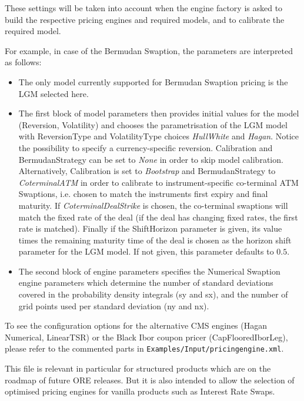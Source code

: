 These settings will be taken into account when the engine factory is asked to build the respective pricing engines and required models, and to calibrate the required model.

\medskip
For example, in case of the Bermudan Swaption, the parameters are interpreted as follows:

\begin{itemize}
\item The only model currently supported for Bermudan Swaption pricing is the LGM selected here. 

\item The first block of model parameters then provides initial values for the model (Reversion, Volatility) and chooses
  the parametrisation of the LGM model with ReversionType and VolatilityType choices {\em HullWhite} and {\em
    Hagan}. Notice the possibility to specify a currency-specific reversion. Calibration and BermudanStrategy can be set
  to {\em None} in order to skip model calibration. Alternatively, Calibration is set to {\em Bootstrap} and
  BermudanStrategy to {\em CoterminalATM} in order to calibrate to instrument-specific co-terminal ATM Swaptions,
  i.e. chosen to match the instruments first expiry and final maturity.  If {\em CoterminalDealStrike} is chosen, the
  co-terminal swaptions will match the fixed rate of the deal (if the deal has changing fixed rates, the first rate is
  matched). Finally if the ShiftHorizon parameter is given, its value times the remaining maturity time of the deal is
  chosen as the horizon shift parameter for the LGM model. If not given, this parameter defaults to $0.5$.

\item The second block of engine parameters specifies the Numerical Swaption engine parameters which determine the
  number of standard deviations covered in the probability density integrals (sy and sx), and the number of grid points
  used per standard deviation (ny and nx).
\end{itemize}

To see the configuration options for the alternative CMS engines (Hagan Numerical, LinearTSR) or the Black Ibor coupon
pricer (CapFlooredIborLeg), please refer to the commented parts in {\tt Examples/Input/pricingengine.xml}.

\medskip
This file is relevant in particular for structured products which are on the roadmap of future ORE releases. But it is also
intended to allow the selection of optimised pricing engines for vanilla products such as Interest Rate Swaps.

